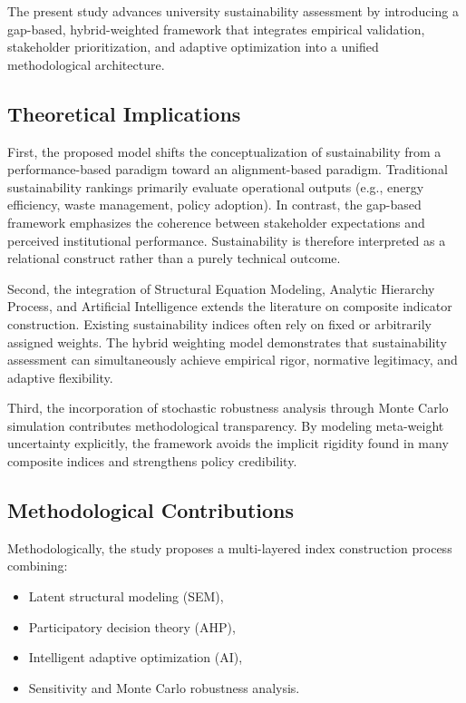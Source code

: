\documentclass[11pt,a4paper]{article}
\begin{document}
The present study advances university sustainability assessment by 
introducing a gap-based, hybrid-weighted framework that integrates 
empirical validation, stakeholder prioritization, and adaptive optimization 
into a unified methodological architecture.

\subsection{Theoretical Implications}

First, the proposed model shifts the conceptualization of sustainability 
from a performance-based paradigm toward an alignment-based paradigm. 
Traditional sustainability rankings primarily evaluate operational outputs 
(e.g., energy efficiency, waste management, policy adoption). In contrast, 
the gap-based framework emphasizes the coherence between stakeholder 
expectations and perceived institutional performance. Sustainability is 
therefore interpreted as a relational construct rather than a purely 
technical outcome.

Second, the integration of Structural Equation Modeling, Analytic 
Hierarchy Process, and Artificial Intelligence extends the literature 
on composite indicator construction. Existing sustainability indices 
often rely on fixed or arbitrarily assigned weights. The hybrid weighting 
model demonstrates that sustainability assessment can simultaneously 
achieve empirical rigor, normative legitimacy, and adaptive flexibility.

Third, the incorporation of stochastic robustness analysis through 
Monte Carlo simulation contributes methodological transparency. By 
modeling meta-weight uncertainty explicitly, the framework avoids the 
implicit rigidity found in many composite indices and strengthens 
policy credibility.

\subsection{Methodological Contributions}

Methodologically, the study proposes a multi-layered index construction 
process combining:

\begin{itemize}
\item Latent structural modeling (SEM),
\item Participatory decision theory (AHP),
\item Intelligent adaptive optimization (AI),
\item Sensitivity and Monte Carlo robustness analysis.
\end{itemize}
\end{document}
